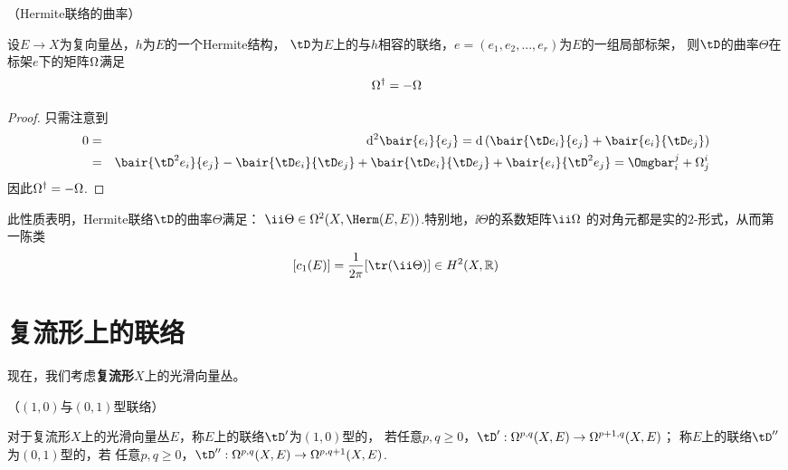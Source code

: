\begin{prop}（Hermite联络的曲率）

设$E\to X$为复向量丛，$h$为$E$的一个Hermite结构，
$\tD$为$E$上的与$h$相容的联络，$e=(e_1,e_2,...,e_r)$为$E$的一组局部标架，
则$\tD$的曲率$\Theta$在标架$e$下的矩阵$\Omega$满足
$$\Omega^\dag=-\Omega$$
\end{prop}

\begin{proof}只需注意到
\begin{eqnarray*}
     0
&=&
     \td^2\bair{e_i}{e_j}
 =
     \td\left(
       \bair{\tD e_i}{e_j}
      +\bair{e_i}{\tD e_j}
     \right)\\
&=&
     \bair{\tD^2e_i}{e_j}
    -\bair{\tD e_i}{\tD e_j}
    +\bair{\tD e_i}{\tD e_j}
    +\bair{e_i}{\tD^2e_j}
 =
     \Omgbar^j_i+\Omg^i_j
\end{eqnarray*}
因此$\Omega^\dag=-\Omega$.
\end{proof}


\begin{rem}
此性质表明，Hermite联络$\tD$的曲率$\Theta$满足：
$\ii\Theta\in\Omg^2(X,\Herm(E,E))$.特别地，$\ii\Theta$的系数矩阵$\ii\Omg$
的对角元都是实的$2$-形式，从而第一陈类
$$[c_1(E)]=\frac{1}{2\pi}[\tr(\ii\Theta)]\in H^2(X,\bbR)$$
\end{rem}

\section{复流形上的联络}
现在，我们考虑\textbf{复流形}$X$上的光滑向量丛。

\begin{definition}（$(1,0)$与$(0,1)$型联络）

对于复流形$X$上的光滑向量丛$E$，称$E$上的联络$\tD'$为$(1,0)$型的，
若任意$p,q\geq 0$，$\tD':\Omg^{p,q}(X,E)\to\Omg^{p+1,q}(X,E)$；
称$E$上的联络$\tD''$为$(0,1)$型的，若
任意$p,q\geq 0$，$\tD'':\Omg^{p,q}(X,E)\to\Omg^{p,q+1}(X,E)$.
\end{definition}

